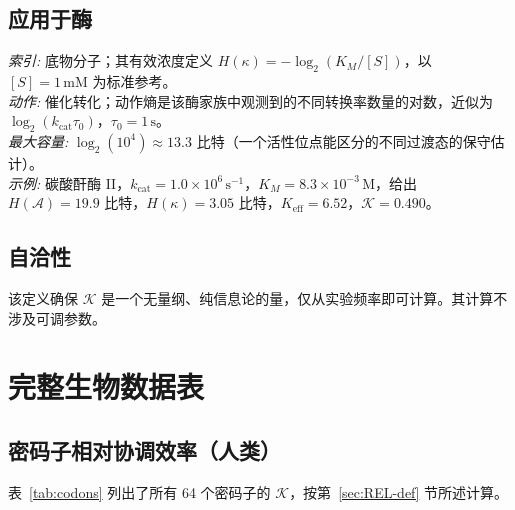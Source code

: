 \documentclass[12pt,a4paper]{article}
\newcommand{\REL}{\mathcal{K}}          %
\newcommand{\ABS}{K_{\mathrm{eff}}}     %
\begin{document}
	\subsection{应用于酶}
	\textit{索引:} 底物分子；其有效浓度定义 \(H(\kappa) = -\log_2(K_M/[S])\)，以 \([S]=1\,\text{mM}\) 为标准参考。\\
	\textit{动作:} 催化转化；动作熵是该酶家族中观测到的不同转换率数量的对数，近似为 \(\log_2(k_{\mathrm{cat}}\tau_0)\)，\(\tau_0=1\,\text{s}\)。\\
	\textit{最大容量:} \(\log_2(10^4)\approx13.3\) 比特（一个活性位点能区分的不同过渡态的保守估计）。\\
	\textit{示例:} 碳酸酐酶 II，\(k_{\mathrm{cat}}=1.0\times10^6\,\text{s}^{-1}\)，\(K_M=8.3\times10^{-3}\,\text{M}\)，给出 \(H(\mathcal{A})=19.9\) 比特，\(H(\kappa)=3.05\) 比特，\(\ABS=6.52\)，\(\REL=0.490\)。
	
	\subsection{自洽性}
	该定义确保 \(\REL\) 是一个无量纲、纯信息论的量，仅从实验频率即可计算。其计算不涉及可调参数。
	
	\section{完整生物数据表}
	\label{sec:tables}
	
	\subsection{密码子相对协调效率（人类）}
	\label{sec:codons}
	表~\ref{tab:codons} 列出了所有 64 个密码子的 \(\REL\)，按第~\ref{sec:REL-def} 节所述计算。
	
\end{document}
